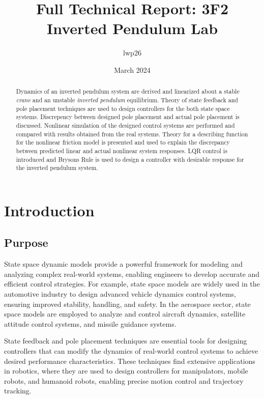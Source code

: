 \documentclass{article}
\begin{document}
\title{Full Technical Report: 3F2 Inverted Pendulum Lab}
\author{lwp26}
\date{March 2024}
\maketitle 

\begin{abstract}
    \centering
    Dynamics of an inverted pendulum system are derived and linearized about a stable \textit{crane} and an unstable \textit{inverted pendulum} equilibrium.
    Theory of state feedback and pole placement techniques are used to design controllers for the both state space systems.
    Discrepency between designed pole placement and actual pole placement is discussed.
    Nonlinear simulation of the designed control systems are performed and compared with results obtained from the real systems.
    Theory for a describing function for the nonlinear friction model is presented and used to explain the discrepancy between predicted linear and actual nonlinear system responses.
    LQR control is introduced and Brysons Rule is used to design a controller with desirable response for the inverted pendulum system.
\end{abstract}

\section{Introduction}

\subsection{Purpose}

State space dynamic models provide a powerful framework for modeling and analyzing complex real-world systems, enabling engineers to develop accurate and efficient control strategies. For example, state space models are widely used in the automotive industry to design advanced vehicle dynamics control systems, ensuring improved stability, handling, and safety. In the aerospace sector, state space models are employed to analyze and control aircraft dynamics, satellite attitude control systems, and missile guidance systems.

State feedback and pole placement techniques are essential tools for designing controllers that can modify the dynamics of real-world control systems to achieve desired performance characteristics. These techniques find extensive applications in robotics, where they are used to design controllers for manipulators, mobile robots, and humanoid robots, enabling precise motion control and trajectory tracking.
\end{document}
